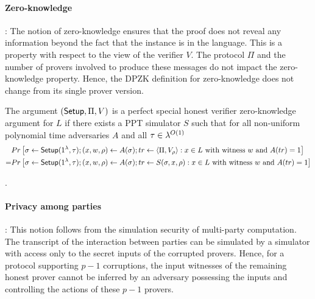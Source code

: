 \paragraph{Zero-knowledge}: 
The notion of zero-knowledge ensures that the proof does not reveal any information beyond the fact that the instance is in the language.
This is a property with respect to the view of the verifier $V$. The protocol $\Pi$ and the number of provers involved to produce these messages do not impact the zero-knowledge property. Hence, the DPZK definition for zero-knowledge does not change from its single prover version.
\begin{definition}
The argument $(\mathsf{Setup}, \Pi, V)$ is a perfect special honest verifier zero-knowledge argument for $L$ if there exists a PPT simulator $S$ such that for all non-uniform polynomial time adversaries $A$ and all $\tau \in {\lambda}^{O(1)}$ 
\begin{align*}
&Pr \left[ \sigma \leftarrow \mathsf{Setup}(1^{\lambda}, \tau); (x,w,\rho) \leftarrow A(\sigma); tr \leftarrow \langle \Pi, V_\rho \rangle: x \in L \text{ with witness } w \text{ and } A(tr)=1 \right] \\
= &Pr \left[\sigma \leftarrow \mathsf{Setup}(1^{\lambda}, \tau); (x,w,\rho) \leftarrow A(\sigma); tr \leftarrow S(\sigma,x,\rho): x \in L \text{ with witness } w \text{ and } A(tr) = 1 \right]
\end{align*}
\end{definition}
.

\paragraph{Privacy among parties}:
This notion follows from the simulation security of multi-party computation. The transcript of the interaction between parties can be simulated by a simulator with access only to the secret inputs of the corrupted provers. Hence, for a protocol supporting $p-1$ corruptions, the input witnesses of the remaining honest prover cannot be inferred by an adversary possessing the inputs and controlling the actions of these $p-1$ provers.

